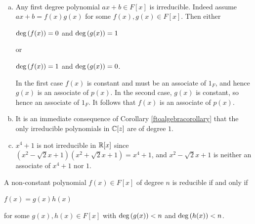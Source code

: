 \documentclass[11pt,fleqn,dvipsnames,usenames]{article}
\newcommand{\p}{\noindent}
\begin{document}
\begin{examples}\label{firstirreducibilityexamples}~
\begin{enumerate}[(a)]
\item \label{firstdegreealwaysirreducible} Any first degree polynomial $ax + b\in F[x]$ is irreducible.  Indeed assume $ax + b = f(x)g(x)$ for some $f(x),g(x)\in F[x]$.  Then either
\begin{center}
$\text{deg}\left(f(x)\right) = 0$ and $\text{deg}\left(g(x)\right) = 1$
\end{center}
or
\begin{center}
$\text{deg}\left(f(x)\right) = 1$ and $\text{deg}\left(g(x)\right) = 0$.
\end{center}
\p In the first case $f(x)$ is constant and must be an associate of $1_{F}$, and hence $g(x)$ is an associate of $p(x)$.  In the second case, $g(x)$ is constant, so hence an associate of $1_{F}$.  It follows that $f(x)$ is an associate of $p(x)$.

\item It is an immediate consequence of Corollary \ref{ftoalgebracorollary} that the only irreducible polynomials in $\mathbb{C}[z]$ are of degree $1$.

\item $x^{4} + 1$ is not irreducible in $\mathbb{R}[x]$ since $(x^2 - \sqrt{2}x + 1)(x^2 + \sqrt{2}x + 1) = x^4 + 1$, and $x^2 - \sqrt{2}x + 1$ is neither an associate of $x^4+1$ nor $1$.
\end{enumerate}
\end{examples}
%
\begin{theorem}
A non-constant polynomial $f(x)\in F[x]$ of degree $n$ is reducible if and only if
\begin{center}
$f(x) = g(x)h(x)$
\end{center}
for some $g(x),h(x)\in F[x]$ with $\text{deg}\left(g(x)\right) < n$ and $\text{deg}\left(h(x)\right) < n$.
\end{theorem}
%
\end{document}
